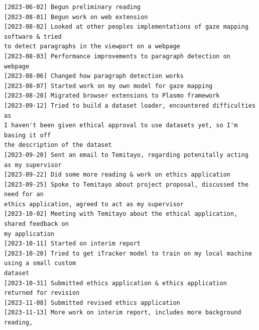 \documentclass[twocolumn]{report}
\begin{document}
\begin{verbatim}
[2023-06-02] Begun preliminary reading 
[2023-08-01] Begun work on web extension 
[2023-08-02] Looked at other peoples implementations of gaze mapping software & tried 
to detect paragraphs in the viewport on a webpage 
[2023-08-03] Performance improvements to paragraph detection on webpage 
[2023-08-06] Changed how paragraph detection works 
[2023-08-07] Started work on my own model for gaze mapping 
[2023-08-20] Migrated browser extensions to Plasmo framework 
[2023-09-12] Tried to build a dataset loader, encountered difficulties as 
I haven't been given ethical approval to use datasets yet, so I'm basing it off 
the description of the dataset
[2023-09-20] Sent an email to Temitayo, regarding potenitally acting as my supervisor
[2023-09-22] Did some more reading & work on ethics application  
[2023-09-25] Spoke to Temitayo about project proposal, discussed the need for an
ethics application, agreed to act as my supervisor 
[2023-10-02] Meeting with Temitayo about the ethical application, shared feedback on 
my application 
[2023-10-11] Started on interim report 
[2023-10-20] Tried to get iTracker model to train on my local machine using a small custom
dataset 
[2023-10-31] Submitted ethics application & ethics application returned for revision
[2023-11-08] Submitted revised ethics application 
[2023-11-13] More work on interim report, includes more background reading, 
\end{verbatim}

\printbibliography
\end{document}
